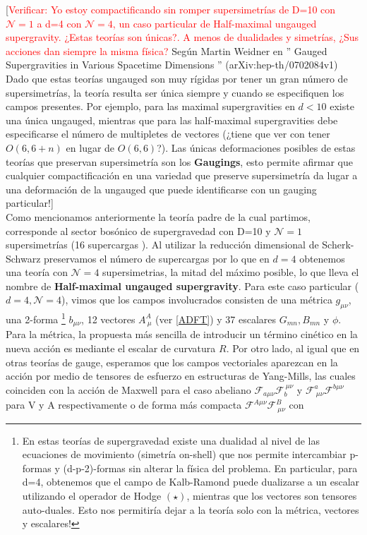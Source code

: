 \documentclass{article}
\numberwithin{equation}{section}
\begin{document}
[\textcolor{red}{Verificar: Yo estoy compactificando sin romper supersimetrías de D=10 con $ \mathcal{N}=1 $ a d=4 con $ \mathcal{N}=4 $, un caso particular de Half-maximal ungauged supergravity. ¿Estas teorías son únicas?. A menos de dualidades y simetrías, ¿Sus acciones dan siempre la misma física?} Según Martin Weidner en '' Gauged Supergravities in Various
Spacetime Dimensions '' (arXiv:hep-th/0702084v1) Dado que estas teorías ungauged son muy rígidas por tener un gran número de supersimetrías, la teoría resulta ser única siempre y cuando se especifiquen los campos presentes. Por ejemplo, para las maximal supergravities en $ d<10 $ existe una única ungauged, mientras que para las half-maximal supergravities debe especificarse el número de multipletes de vectores (¿tiene que ver con tener $ O(6,6+n) $ en lugar de $ O(6,6) $?). Las únicas deformaciones posibles de estas teorías que preservan supersimetría son los \textbf{Gaugings}, esto permite afirmar que cualquier compactificación en una variedad que preserve supersimetría da lugar a una deformación de la ungauged que puede identificarse con un gauging particular!]\\  

Como mencionamos anteriormente la teoría padre de la cual partimos, corresponde al sector bosónico de supergravedad con D=10 y $ \mathcal{N}=1 $ supersimetrías (16 supercargas ). Al utilizar la reducción dimensional de Scherk-Schwarz preservamos el número de supercargas por lo que en $ d=4 $ obtenemos una teoría con $ \mathcal{N}=4 $ supersimetrias, la mitad del máximo posible, lo que lleva el nombre de \textbf{Half-maximal ungauged supergravity}. Para este caso particular ($ d=4, \mathcal{N}=4 $), vimos que los campos involucrados consisten de una métrica $ g_{\mu \nu} $, una 2-forma
\footnote{En estas teorías de supergravedad existe una dualidad al nivel de las ecuaciones de movimiento (simetría on-shell) que nos permite intercambiar p-formas y (d-p-2)-formas sin alterar la física del problema. En particular, para d=4, obtenemos que el campo de Kalb-Ramond puede dualizarse a un escalar utilizando el operador de Hodge $ (\star) $, mientras que los vectores son tensores auto-duales. Esto nos permitiría dejar a la teoría solo con la métrica, vectores y escalares!}
$ b_{\mu \nu} $, 12 vectores $ A_{\ \mu}^A $ (ver \ref{ADFT}) y 37 escalares $ G_{m n}, B_{m n} $ y $ \phi $. Para la métrica, la propuesta más sencilla de introducir un término cinético en la nueva acción es mediante el escalar de curvatura $ R $. Por otro lado, al igual que en otras teorías de gauge, esperamos que los campos vectoriales aparezcan en la acción por medio de tensores de esfuerzo en estructuras de Yang-Mills, las cuales coinciden con la acción de Maxwell para el caso abeliano $ \mathcal{F}_{a \mu \nu} \mathcal{F}_b^{\ \mu \nu} $ y $ \mathcal{F}^a_{\ \mu \nu} \mathcal{F}^{b \mu \nu} $ para V y A respectivamente o de forma más compacta $ \mathcal{F}^{A \mu \nu} \mathcal{F}^B_{\ \mu \nu} $ con
\end{document}
